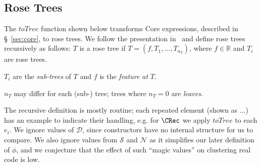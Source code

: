 \subsection{Rose Trees}\label{sec:rosetree}

The $toTree$ function shown below transforms Core expressions, described in
\S~\ref{sec:core}, to rose trees. We follow the presentation
in~\cite{blundell2012bayesian} and define rose trees recursively as follows: $T$
is a rose tree if $T = (f, T_1, \dots, T_{n_T})$, where $f \in \mathbb{R}$ and
$T_i$ are rose trees.

$T_i$ are the \emph{sub-trees} of $T$ and $f$ is the \emph{feature at} $T$.

$n_T$ may differ for each (sub-) tree; trees where $n_T = 0$ are \emph{leaves}.

The recursive definition is mostly routine; each repeated element (shown as
$\dots$) has an example to indicate their handling, e.g. for $\CRec$ we apply
$toTree$ to each $e_i$. We ignore values of $\mathcal{D}$, since constructors
have no internal structure for us to compare. We also ignore values from
$\mathcal{S}$ and $\mathcal{N}$ as it simplifies our later definition of $\phi$,
and we conjecture that the effect of such ``magic values'' on clustering real
code is low.

